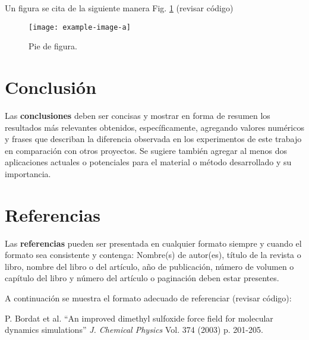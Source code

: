 \documentclass[11pt,letterpaper,twocolumn]{article}
\begin{document}
Un figura se cita de la siguiente manera Fig. \ref{fig:my_label} (revisar código)
\begin{figure}[ht]
    \centering
    \texttt{[image: example-image-a]} 
    \caption{Pie de figura.}
    \label{fig:my_label}
\end{figure}
\section{Conclusión}
\justify
Las \textbf{conclusiones} deben ser concisas y mostrar en forma de resumen los resultados más relevantes obtenidos, específicamente, agregando valores numéricos y frases que describan la diferencia observada en los experimentos de este trabajo en comparación con otros proyectos. Se sugiere también agregar al menos dos aplicaciones actuales o potenciales para el material o método desarrollado
y su importancia.


\section{Referencias}
\justify
Las \textbf{referencias} pueden ser presentada en cualquier formato siempre y cuando el formato sea consistente y contenga: Nombre(s) de autor(es), título de la revista o libro, nombre del libro o del artículo, año de publicación, número de volumen o capítulo del libro y número del artículo o paginación deben estar presentes. 
\par \vspace{5mm}
A continuación se muestra el formato adecuado  de referenciar (revisar código):


\begin{thebibliography}{9}
 P. Bordat et al. ``An improved dimethyl sulfoxide force field for molecular dynamics simulations'' \textit{J. Chemical Physics} Vol. 374 (2003) p. 201-205.
\end{thebibliography} 
\end{document}
